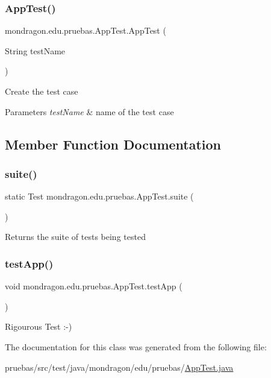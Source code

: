 \subsubsection{\texorpdfstring{App\+Test()}{AppTest()}}
{\footnotesize\ttfamily mondragon.\+edu.\+pruebas.\+App\+Test.\+App\+Test (\begin{DoxyParamCaption}\item[{String}]{test\+Name }\end{DoxyParamCaption})}

Create the test case


\begin{DoxyParams}{Parameters}
{\em test\+Name} & name of the test case \\
\hline
\end{DoxyParams}


\subsection{Member Function Documentation}
\mbox{\label{classmondragon_1_1edu_1_1pruebas_1_1_app_test_a74268ac7bf97d151c9f4c49293ce67d4}} 
\subsubsection{\texorpdfstring{suite()}{suite()}}
{\footnotesize\ttfamily static Test mondragon.\+edu.\+pruebas.\+App\+Test.\+suite (\begin{DoxyParamCaption}{ }\end{DoxyParamCaption})\hspace{0.3cm}{\ttfamily [static]}}

\begin{DoxyReturn}{Returns}
the suite of tests being tested 
\end{DoxyReturn}
\mbox{\label{classmondragon_1_1edu_1_1pruebas_1_1_app_test_a20f975819ae8283342687eb9f7c1d50c}} 
\subsubsection{\texorpdfstring{test\+App()}{testApp()}}
{\footnotesize\ttfamily void mondragon.\+edu.\+pruebas.\+App\+Test.\+test\+App (\begin{DoxyParamCaption}{ }\end{DoxyParamCaption})}

Rigourous Test \+:-\/) 

The documentation for this class was generated from the following file\+:\begin{DoxyCompactItemize}
\item 
pruebas/src/test/java/mondragon/edu/pruebas/\mbox{\hyperlink{_app_test_8java}{App\+Test.\+java}}\end{DoxyCompactItemize}
